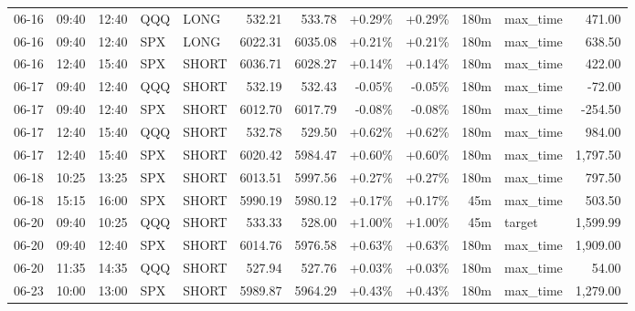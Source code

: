 \documentclass[11pt,a4paper,twoside]{article}
\begin{document}
\begin{center}
\begin{longtable}{>{\color{txtmain}}l l l l l r r r r r >{\color{txtmain}}l r}
06-16 & 09:40 & 12:40 & QQQ & LONG & 532.21 & 533.78 & \textcolor{wingreen}{+0.29\%} & \textcolor{wingreen}{+0.29\%} & 180m & max\_time & \textcolor{wingreen}{471.00} \\
06-16 & 09:40 & 12:40 & SPX & LONG & 6022.31 & 6035.08 & \textcolor{wingreen}{+0.21\%} & \textcolor{wingreen}{+0.21\%} & 180m & max\_time & \textcolor{wingreen}{638.50} \\
06-16 & 12:40 & 15:40 & SPX & SHORT & 6036.71 & 6028.27 & \textcolor{wingreen}{+0.14\%} & \textcolor{wingreen}{+0.14\%} & 180m & max\_time & \textcolor{wingreen}{422.00} \\
06-17 & 09:40 & 12:40 & QQQ & SHORT & 532.19 & 532.43 & \textcolor{lossred}{-0.05\%} & \textcolor{lossred}{-0.05\%} & 180m & max\_time & \textcolor{lossred}{-72.00} \\
06-17 & 09:40 & 12:40 & SPX & SHORT & 6012.70 & 6017.79 & \textcolor{lossred}{-0.08\%} & \textcolor{lossred}{-0.08\%} & 180m & max\_time & \textcolor{lossred}{-254.50} \\
06-17 & 12:40 & 15:40 & QQQ & SHORT & 532.78 & 529.50 & \textcolor{wingreen}{+0.62\%} & \textcolor{wingreen}{+0.62\%} & 180m & max\_time & \textcolor{wingreen}{984.00} \\
06-17 & 12:40 & 15:40 & SPX & SHORT & 6020.42 & 5984.47 & \textcolor{wingreen}{+0.60\%} & \textcolor{wingreen}{+0.60\%} & 180m & max\_time & \textcolor{wingreen}{1,797.50} \\
06-18 & 10:25 & 13:25 & SPX & SHORT & 6013.51 & 5997.56 & \textcolor{wingreen}{+0.27\%} & \textcolor{wingreen}{+0.27\%} & 180m & max\_time & \textcolor{wingreen}{797.50} \\
06-18 & 15:15 & 16:00 & SPX & SHORT & 5990.19 & 5980.12 & \textcolor{wingreen}{+0.17\%} & \textcolor{wingreen}{+0.17\%} & 45m & max\_time & \textcolor{wingreen}{503.50} \\
06-20 & 09:40 & 10:25 & QQQ & SHORT & 533.33 & 528.00 & \textcolor{wingreen}{+1.00\%} & \textcolor{wingreen}{+1.00\%} & 45m & target & \textcolor{wingreen}{1,599.99} \\
06-20 & 09:40 & 12:40 & SPX & SHORT & 6014.76 & 5976.58 & \textcolor{wingreen}{+0.63\%} & \textcolor{wingreen}{+0.63\%} & 180m & max\_time & \textcolor{wingreen}{1,909.00} \\
06-20 & 11:35 & 14:35 & QQQ & SHORT & 527.94 & 527.76 & \textcolor{wingreen}{+0.03\%} & \textcolor{wingreen}{+0.03\%} & 180m & max\_time & \textcolor{wingreen}{54.00} \\
06-23 & 10:00 & 13:00 & SPX & SHORT & 5989.87 & 5964.29 & \textcolor{wingreen}{+0.43\%} & \textcolor{wingreen}{+0.43\%} & 180m & max\_time & \textcolor{wingreen}{1,279.00} \\

\end{longtable}
\end{center}
\end{document}
